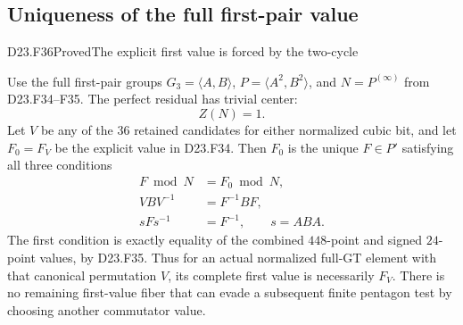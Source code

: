 \subsection{Uniqueness of the full first-pair value}

\begin{statement}{D23.F36}{Proved}{The explicit first value is forced by the two-cycle}
\end{statement}
Use the full first-pair groups $G_3=\langle A,B\rangle$,
$P=\langle A^2,B^2\rangle$, and
$N=P^{(\infty)}$ from D23.F34--F35. The perfect residual has
trivial center:
\[
                             Z(N)=1.                     \tag{D23.F36.1}
\]
Let $V$ be any of the $36$ retained candidates for either normalized
cubic bit, and let $F_0=F_V$ be the explicit value in D23.F34.
Then $F_0$ is the unique $F\in P'$ satisfying all three conditions
\[
 \begin{split}
 F\bmod N&=F_0\bmod N,\\
 VBV^{-1}&=F^{-1}BF,\\
 sFs^{-1}&=F^{-1},\qquad s=ABA.
 \end{split}                                             \tag{D23.F36.2}
\]
The first condition is exactly equality of the combined
$448$-point and signed $24$-point values, by D23.F35.
Thus for an actual normalized full-GT element with that canonical
permutation $V$, its complete first value is necessarily $F_V$.
There is no remaining first-value fiber that can evade a subsequent
finite pentagon test by choosing another commutator value.

